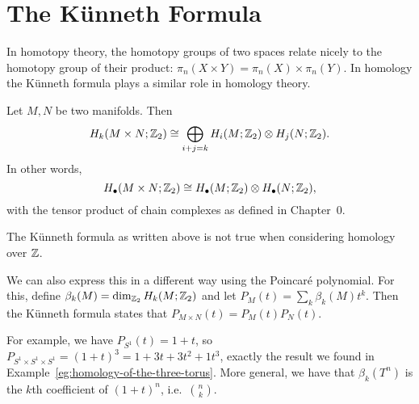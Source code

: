 \section{The Künneth Formula}
In homotopy theory, the homotopy groups of two spaces relate nicely to the homotopy group of their product: $\pi_n(X \times Y) = \pi_n(X) \times \pi_n(Y)$.
In homology the Künneth formula plays a similar role in homology theory.
\begin{theorem}
    Let $M, N$ be two manifolds. Then
    \[
        H_k(M \times N; \mathbb{Z}_2) \cong
        \bigoplus_{i+j  = k} H_i(M; \mathbb{Z}_2) \otimes H_j(N; \mathbb{Z}_2)
    .\]
In other words,
\[
    H_{\bullet}(M \times N; \mathbb{Z}_2) \cong H_{\bullet}(M; \mathbb{Z}_2) \otimes H_\bullet(N; \mathbb{Z}_2)
,\] 
with the tensor product of chain complexes as defined in Chapter~0.
\end{theorem}
\begin{remark}
    The Künneth formula as written above is not true when considering homology over $\mathbb{Z}$.
\end{remark}
\begin{remark}
    We can also express this in a different way using the Poincaré polynomial.
    For this, define $\beta_k(M) = \dim_{\mathbb{Z}_2} H_k(M;\mathbb{Z}_2)$ and let $P_M(t) = \sum_k \beta_k(M) t^{k}$.
    Then the Künneth formula states that $P_{M \times N}(t) = P_M(t) P_N(t)$.


    For example, we have $P_{S^{1}}(t) = 1 + t$, so $P_{S^{1}\times S^{1}\times S^{1}} = (1 + t)^3 = 1 + 3t + 3t^2 + 1t^3$, exactly the result we found in Example~\ref{eg:homology-of-the-three-torus}.
    More general, we have that $\beta_k(T^{n})$ is the $k$th coefficient of $(1+t)^{n}$, i.e.\ $\binom{n}{k}$.
\end{remark}
